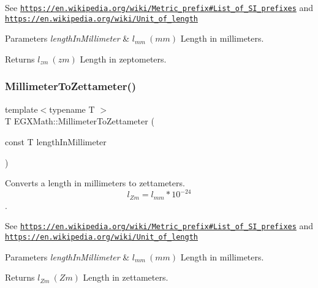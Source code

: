 See \href{https://en.wikipedia.org/wiki/Metric_prefix#List_of_SI_prefixes}{\tt https\+://en.\+wikipedia.\+org/wiki/\+Metric\+\_\+prefix\#\+List\+\_\+of\+\_\+\+S\+I\+\_\+prefixes} and \href{https://en.wikipedia.org/wiki/Unit_of_length}{\tt https\+://en.\+wikipedia.\+org/wiki/\+Unit\+\_\+of\+\_\+length} 
\begin{DoxyParams}{Parameters}
{\em length\+In\+Millimeter} & $ l_{mm}\ (mm)$ Length in millimeters. \\
\hline
\end{DoxyParams}
\begin{DoxyReturn}{Returns}
$ l_{zm}\ (zm)$ Length in zeptometers. 
\end{DoxyReturn}
\mbox{\label{group___e_g_x_math-_conversions-_length_conversions-_s_i-_millimeter-_s_i_ga06531acdd75d87de598010df5c9536f5}} 
\subsubsection{\texorpdfstring{Millimeter\+To\+Zettameter()}{MillimeterToZettameter()}}
{\footnotesize\ttfamily template$<$typename T $>$ \\
T E\+G\+X\+Math\+::\+Millimeter\+To\+Zettameter (\begin{DoxyParamCaption}\item[{const T}]{length\+In\+Millimeter }\end{DoxyParamCaption})}



Converts a length in millimeters to zettameters. \[ l_{Zm}=l_{mm} * 10^{-24} \]. 

See \href{https://en.wikipedia.org/wiki/Metric_prefix#List_of_SI_prefixes}{\tt https\+://en.\+wikipedia.\+org/wiki/\+Metric\+\_\+prefix\#\+List\+\_\+of\+\_\+\+S\+I\+\_\+prefixes} and \href{https://en.wikipedia.org/wiki/Unit_of_length}{\tt https\+://en.\+wikipedia.\+org/wiki/\+Unit\+\_\+of\+\_\+length} 
\begin{DoxyParams}{Parameters}
{\em length\+In\+Millimeter} & $ l_{mm}\ (mm)$ Length in millimeters. \\
\hline
\end{DoxyParams}
\begin{DoxyReturn}{Returns}
$ l_{Zm}\ (Zm)$ Length in zettameters. 
\end{DoxyReturn}
